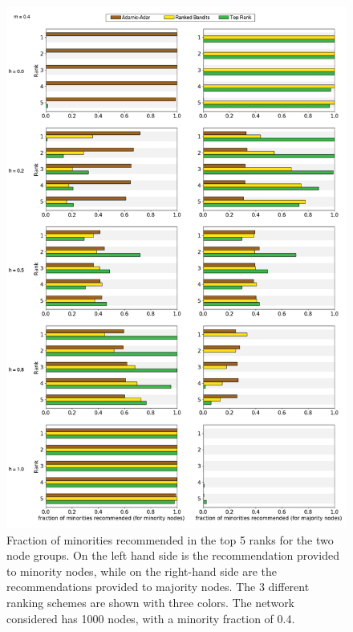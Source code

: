 \begin{figure}
	\includegraphics[scale=0.28]{images/proposal_figure_3_5}
	\caption{Fraction of minorities recommended in the top 5 ranks for the two node groups. On the left hand side is the recommendation provided to minority nodes, while on the right-hand side are the recommendations provided to majority nodes. The 3 different ranking schemes are shown with three colors. The network considered has 1000 nodes, with a minority fraction of 0.4.}
	\label{fig-rank_5}
\end{figure}
